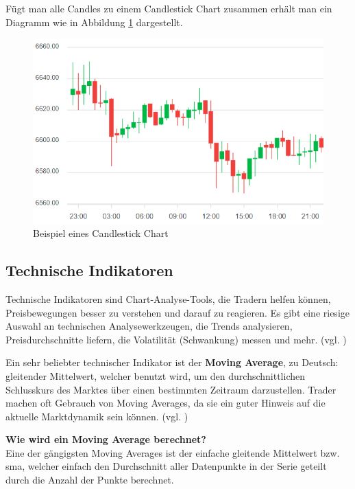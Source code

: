 \documentclass[oneside]{ausarbeitung}
\begin{document}
Fügt man alle Candles zu einem Candlestick Chart zusammen erhält man
ein Diagramm wie in Abbildung \ref{fig:2} dargestellt. \\

\begin{figure}[H]
  \centering
  \includegraphics[height=0.43\textheight]{img/candlestick_chart.png}
  \caption{Beispiel eines Candlestick Chart\cite{candlestick_chart_pic}}
  \label{fig:2}
\end{figure}

\subsection{Technische Indikatoren}
\label{sub:technische_Indikatoren}

Technische Indikatoren sind Chart-Analyse-Tools, die Tradern helfen
können, Preisbewegungen besser zu verstehen und darauf zu reagieren.
Es gibt eine riesige Auswahl an technischen Analysewerkzeugen, die
Trends analysieren, Preisdurchschnitte liefern, die Volatilität
(Schwankung) messen und mehr. (vgl. \cite{technical_indicators})

Ein sehr beliebter technischer Indikator ist der \textbf{Moving
Average}, zu Deutsch: gleitender Mittelwert, welcher benutzt wird, um
den durchschnittlichen Schlusskurs des Marktes über einen bestimmten
Zeitraum darzustellen. Trader machen oft Gebrauch von Moving Averages,
da sie ein guter Hinweis auf die aktuelle Marktdynamik sein können.
(vgl. \cite{moving_average})

\textbf{Wie wird ein Moving Average berechnet?} \\
Eine der gängigsten Moving Averages ist der einfache gleitende
Mittelwert bzw. \ac{sma}, welcher einfach den Durchschnitt aller
Datenpunkte in der Serie geteilt durch die Anzahl der
Punkte berechnet\cite{moving_average}.
\end{document}
